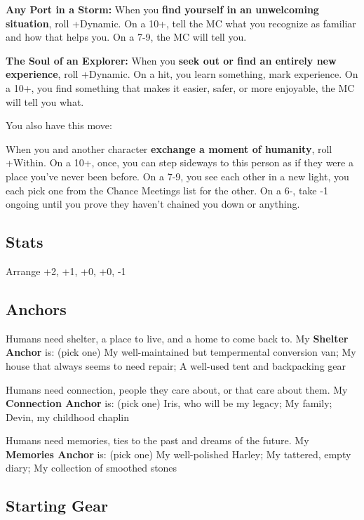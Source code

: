 \documentclass[
  oneside,
  statementpaper,
  9pt]{memoir}
\begin{document}
\textbf{Any Port in a Storm:} When you \textbf{find yourself in an
unwelcoming situation}, roll +Dynamic. On a 10+, tell the MC what you
recognize as familiar and how that helps you. On a 7-9, the MC will tell
you.

\textbf{The Soul of an Explorer:} When you \textbf{seek out or find an
entirely new experience}, roll +Dynamic. On a hit, you learn something,
mark experience. On a 10+, you find something that makes it easier,
safer, or more enjoyable, the MC will tell you what.

You also have this move:

When you and another character \textbf{exchange a moment of humanity},
roll +Within. On a 10+, once, you can step sideways to this person as if
they were a place you've never been before. On a 7-9, you see each other
in a new light, you each pick one from the Chance Meetings list for the
other. On a 6-, take -1 ongoing until you prove they haven't chained you
down or anything.

\hypertarget{stats-10}{%
\subsection{Stats}\label{stats-10}}

Arrange +2, +1, +0, +0, -1

\hypertarget{anchors-10}{%
\subsection{Anchors}\label{anchors-10}}

Humans need shelter, a place to live, and a home to come back to. My
\textbf{Shelter Anchor} is: (pick one) My well-maintained but
tempermental conversion van; My house that always seems to need repair;
A well-used tent and backpacking gear

Humans need connection, people they care about, or that care about them.
My \textbf{Connection Anchor} is: (pick one) Iris, who will be my
legacy; My family; Devin, my childhood chaplin

Humans need memories, ties to the past and dreams of the future. My
\textbf{Memories Anchor} is: (pick one) My well-polished Harley; My
tattered, empty diary; My collection of smoothed stones

\hypertarget{starting-gear-8}{%
\subsection{Starting Gear}\label{starting-gear-8}}
\end{document}
